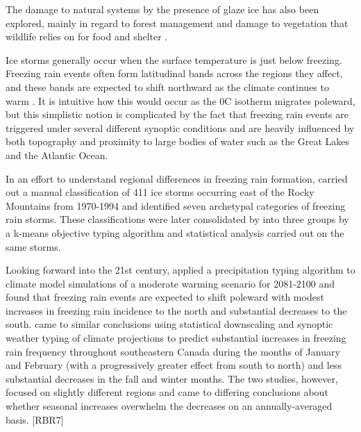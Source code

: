 \documentclass[twocol]{ametsoc}
\begin{document}
The damage to natural systems by the presence of glaze ice has also been explored, mainly in regard to forest management and damage to vegetation that wildlife relies on for food and shelter \citep{pellikka2000modelling}.


Ice storms generally occur when the surface temperature is just below freezing. Freezing rain events often form latitudinal bands across the regions they affect, and these bands are expected to shift northward as the climate continues to warm \citep{cheng2011possible,lambert2011simulated}. It is intuitive how this would occur as the 0\degree C isotherm migrates poleward, but this simplistic notion is complicated by the fact that freezing rain events are triggered under several different synoptic conditions and are heavily influenced by both topography and proximity to large bodies of water such as the Great Lakes and the Atlantic Ocean. 

In an effort to understand regional differences in freezing rain formation, \citet{rauber2001synoptic} carried out a manual classification of 411 ice storms occurring east of the Rocky Mountains from 1970-1994 and identified seven archetypal categories of freezing rain storms. These classifications were later consolidated by \citet{erfani2012automated} into three groups by a k-means objective typing algorithm and statistical analysis carried out on the same storms. 

Looking forward into the 21st century, \citet{lambert2011simulated} applied a precipitation typing algorithm to climate model simulations of a moderate warming scenario for 2081-2100 and found that freezing rain events are expected to shift poleward with modest increases in freezing rain incidence to the north and substantial decreases to the south. \citet{cheng2011possible} came to similar conclusions using statistical downscaling and synoptic weather typing of climate projections to predict substantial increases in freezing rain frequency throughout southeastern Canada during the months of January and February (with a progressively greater effect from south to north) and less substantial decreases in the fall and winter months. The two studies, however, focused on slightly different regions and came to differing conclusions about whether seasonal increases overwhelm the decreases on an annually-averaged basis. [RBR7]
\end{document}
